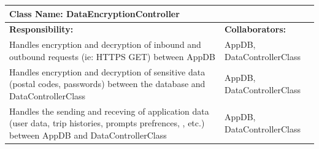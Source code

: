 \documentclass[]{article}
\begin{document}
	\begin{table}[H]
	\centering
	\begin{tabular}{|p{6cm}|p{6cm}|}
	\hline 
		\multicolumn{2}{|l|}{\textbf{Class Name: DataEncryptionController}} \\
	\hline
	\textbf{Responsibility:} & \textbf{Collaborators:} \\
	\hline
	Handles encryption and decryption of inbound and outbound requests (ie: HTTPS GET) between AppDB& AppDB, DataControllerClass\\ \hline
	Handles encryption and decryption of sensitive data (postal codes, passwords) between the database and DataControllerClass& AppDB, DataControllerClass\\ \hline
	Handles the sending and receving of application data (user data, trip histories, prompts prefrences, , etc.) between AppDB and DataControllerClass & AppDB, DataControllerClass\\ \hline
	\end{tabular}
	\end{table}
\end{document}
